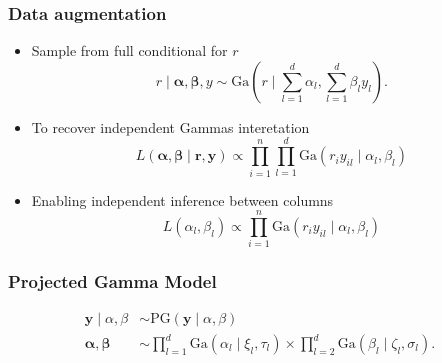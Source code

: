 \documentclass[aspectratio=169]{beamer}
\begin{document}
\begin{frame}
  \frametitle{Data augmentation}
  \begin{itemize}
    \item Sample from full conditional for $r$
      \begin{equation*}
        r\mid\bm{ \alpha},\bm{ \beta}, y \sim \text{Ga}\left(r\mid{\textstyle\sum}_{l = 1}^d \alpha_l,
              {\textstyle\sum}_{l = 1}^d \beta_ly_l\right).
      \end{equation*}
    \pause
    \item To recover independent Gammas interetation
      \begin{equation*}
        L(\bm{\alpha},\bm{\beta} \mid \bm{r},\bm{y}) \propto
            \prod_{i = 1}^n\prod_{l = 1}^{d}\text{Ga}\left(r_iy_{il}\mid\alpha_l,\beta_l\right)
      \end{equation*}
    \pause
    \item Enabling independent inference between columns
      \begin{equation*}
        L(\alpha_l,\beta_l) \propto \prod_{i = 1}^n
                  \text{Ga}\left(r_iy_{il}\mid\alpha_l,\beta_l\right)
      \end{equation*}
  \end{itemize}
\end{frame}

\begin{frame}
  \frametitle{Projected Gamma Model}
  \begin{equation*}
    \begin{aligned}
      \bm{ y}\mid\alpha,\beta &\sim \text{PG}(\bm{ y}\mid\alpha,\beta)\\
      \bm{ \alpha},\bm{\beta} &\sim {\textstyle \prod}_{l = 1}^d \text{Ga}(\alpha_l \mid \xi_l,\tau_l)
              \times {\textstyle \prod}_{l = 2}^d \text{Ga}(\beta_l\mid \zeta_l,\sigma_l).
    \end{aligned}
  \end{equation*}
\end{frame}
\end{document}
